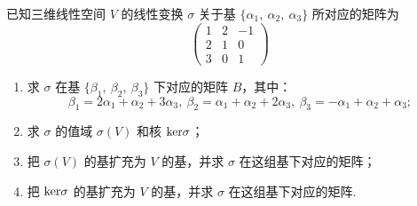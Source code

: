 \begin{example}
    已知三维线性空间 $V$ 的线性变换 $\sigma$ 关于基 $\{\alpha_1,\ \alpha_2,\ \alpha_3\}$ 所对应的矩阵为
	\[\begin{pmatrix}1 & 2 & -1 \\ 2 & 1 & 0 \\ 3 & 0 & 1\end{pmatrix}\]
	\begin{enumerate}[label=(\arabic*)]
        \item 求 $\sigma$ 在基 $\{\beta_1,\ \beta_2,\ \beta_3\}$ 下对应的矩阵 $B$，其中：
		\[\beta_1=2\alpha_1+\alpha_2+3\alpha_3,\ \beta_2=\alpha_1+\alpha_2+2\alpha_3,\ \beta_3=-\alpha_1+\alpha_2+\alpha_3;\]
        \item 求 $\sigma$ 的值域 $\sigma(V)$ 和核 $\textup{ker}\sigma$；
        \item 把 $\sigma(V)$ 的基扩充为 $V$ 的基，并求 $\sigma$ 在这组基下对应的矩阵；
        \item 把 $\textup{ker}\sigma$ 的基扩充为 $V$ 的基，并求 $\sigma$ 在这组基下对应的矩阵.
    \end{enumerate}
\end{example}
\begin{solution}

\end{solution}

